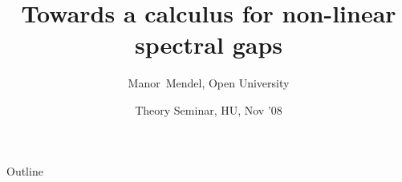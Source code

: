 \documentclass[compress]{beamer}
\title[Non-linear spectral gaps]{Towards a calculus for non-linear spectral gaps}
\author[M.~Mendel]{Manor~Mendel, Open University}
\institute[OUI]{Jointly with Assaf Naor, NYU}
\date[Nov '08]{Theory Seminar, HU, Nov '08}
\begin{document}

\begin{frame}
  \titlepage
\end{frame}

\begin{frame}{Outline}
  \tableofcontents
\end{frame}
\end{document}
